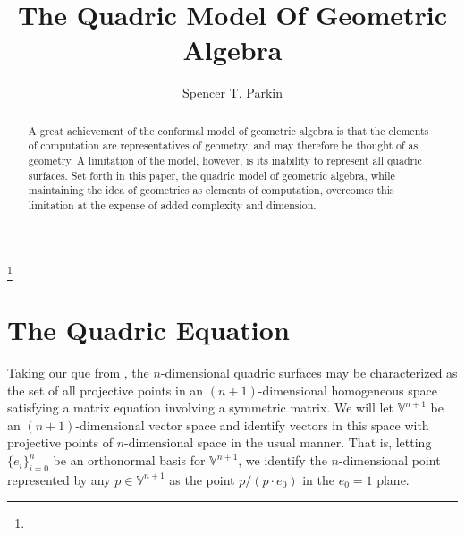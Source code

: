 \documentclass{ecgd-l}
\theoremstyle{definition}
\theoremstyle{remark}
\numberwithin{equation}{section}
\newcommand{\V}{\mathbb{V}}
\begin{document}
\title{The Quadric Model Of Geometric Algebra}


\author{Spencer T. Parkin}
\address{}
\curraddr{}
\thanks{}



\date{}

\dedicatory{}

\begin{abstract}
A great achievement of the conformal model of geometric algebra is that the elements
of computation are representatives of geometry, and may therefore be thought of as geometry.
A limitation of the model, however, is its inability to represent all quadric surfaces.
Set forth in this paper, the quadric model of geometric algebra, while maintaining the idea
of geometries as elements of computation, overcomes this limitation at the expense of
added complexity and dimension.
\end{abstract}

\maketitle


\nocite{DoranHestenes93}
\nocite{WikipediaQuadricEntry}

\section{The Quadric Equation}

Taking our que from \cite{WikipediaQuadricEntry}, the $n$-dimensional quadric surfaces
may be characterized as the set of all projective points in an $(n+1)$-dimensional homogeneous space
satisfying a matrix equation involving a symmetric matrix.  We will let $\V^{n+1}$ be an
$(n+1)$-dimensional vector space and identify vectors in this space with projective
points of $n$-dimensional space in the usual manner.  That is, letting $\{e_i\}_{i=0}^n$
be an orthonormal basis for $\V^{n+1}$, we identify the $n$-dimensional point
represented by any $p\in\V^{n+1}$ as the point $p/(p\cdot e_0)$ in the $e_0=1$ plane.
\end{document}
